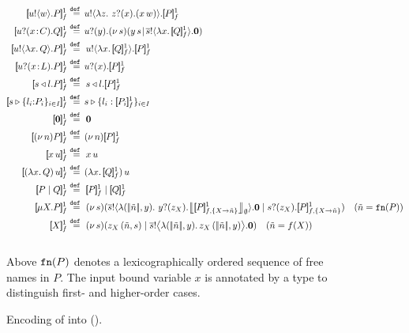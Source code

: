 \begin{figure}[t!]
\begin{align*}
	\pmapp{\bout{u}{w} P}{1}{f}	&\defeq	\!\bout{u}{ \abs{z}{\,\binp{z}{x} (\appl{x}{w})} } \pmapp{P}{1}{f}
	\\
	\pmapp{\binp{u}{\AT{x}{C}} Q}{1}{f}	&\defeq	\!\binp{u}{y} \newsp{s}{\appl{y}{s} \!\Par\! \bout{\dual{s}}{\abs{x}{\pmapp{Q}{1}{f}}} \inact}
		\\
	\pmapp{\bout{u}{\abs{{x}}{Q}} P}{1}{f}  &\defeq \bout{u}{\abs{{x}}{\pmapp{Q}{1}{f}}} \pmapp{P}{1}{f}
	\\
	\pmapp{\binp{u}{\AT{x}{L}} P}{1}{f} &\defeq \!\binp{u}{x} \pmapp{P}{1}{f}
	\\
	\pmapp{\bsel{s}{l} P}{1}{f} &\defeq \bsel{s}{l} \pmapp{P}{1}{f}
	\\
	\pmapp{\bbra{s}{l_i{:}P_i}_{i \in I}}{1}{f} &\defeq \!\bbra{s}{l_i: \pmapp{P_i}{1}{f}}_{i \in I}
	\\
	\pmapp{\inact}{1}{f} &\defeq \inact
	\\
	\pmapp{\news{n} P}{1}{f} &\defeq \!\news{n} \pmapp{P}{1}{f}
	\\
	\pmapp{{x}\, {u}}{1}{f} &\defeq \appl{x}{u}
	\\
	\pmapp{\appl{(\abs{x}{Q})}{u}}{1}{f} &\defeq \!\appl{(\abs{x}{\pmapp{Q}{1}{f}})}{u}
	\\	
	\pmapp{P \Par Q}{1}{f} & \defeq \pmapp{P}{1}{f} \Par \pmapp{Q}{1}{f}
	\\
	\pmapp{\recp{X}{P}}{1}{f} &\defeq
		\newsp{s}{\bout{\dual{s}}{\abs{(\vmap{\tilde{n}}, y)} \,{\binp{y}{z_\X} \auxmapp{\pmapp{P}{1}{{f,\{\rvar{X}\to \tilde{n}\}}}}{{}}{\es}}} \inact \Par  \binp{s}{z_\X} \pmapp{P}{1}{{f,\{\rvar{X}\to \tilde{n}\}}}}
	\quad
	(\tilde{n} = \fn{P})
	\\ 
	\pmapp{\rvar{X}}{1}{f} & \defeq 
		\newsp{s}{\appl{z_X}{(\tilde{n}, s)} \Par \bbout{\dual{s}}{ \abs{(\vmap{\tilde{n}},y)}{\appl{z_X}{(\vmap{\tilde{n}}, y)}}} \inact}  \quad (\tilde{n} = f(\rvar{X}))
\end{align*}
\\[1mm]
%
Above $\mathtt{fn}(P)$ denotes a lexicographically ordered sequence  of free names in $P$.
The input bound variable $x$ is annotated by a type to distinguish first- and higher-order cases.
\caption{\label{f:enc:hopi_to_ho}Encoding of \HOp into \HO ().}
\end{figure}

